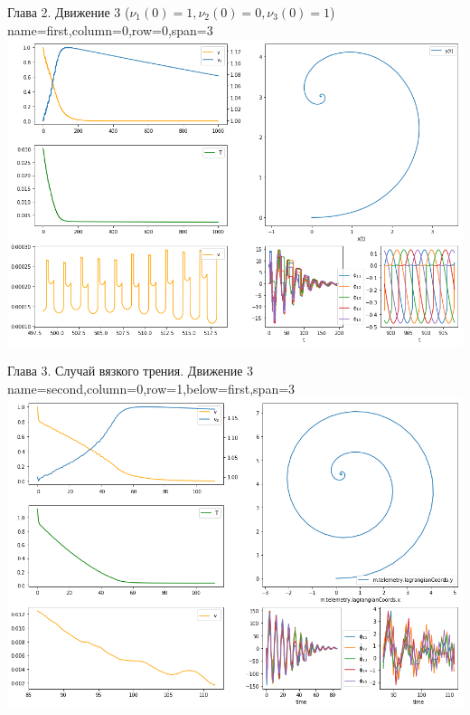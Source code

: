 \begin{mynotitleposter}
    
    \headerbox
    {Глава 2. Движение 3 ($\nu_1(0) = 1, \nu_2(0) = 0, \nu_3(0) = 1$)}
    {name=first,column=0,row=0,span=3}
    {
        {\huge\bf
            \centering
            \includegraphics[width=\linewidth]{content/pic/new/impact_3_sub.png}
            \vspace{-10pt}
        }
    }
    
    \headerbox
    {Глава 3. Случай вязкого трения. Движение 3}
    {name=second,column=0,row=1,below=first,span=3}
    {
        {\huge\bf
            \centering
            \includegraphics[width=\linewidth]{content/pic/new/visc_3_100_sub.png}
        }
    }
\end{mynotitleposter}

